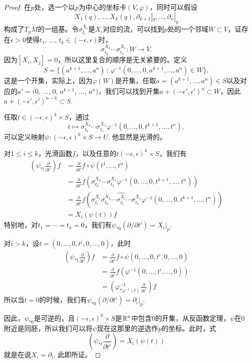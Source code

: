 \begin{proof}
在$p$处，选一个以$p$为中心的坐标卡$(V,\varphi)$，同时可以假设
\[
	X_1(q),\dots,X_k(q),\partial_{k+1}|_q,\dots,\partial_{n}|_q
\]
构成了$T_pM$的一组基。令$\sigma_{t_i}^{X_i}$是$X_i$对应的流，可以找到$p$处的一个邻域$W\subset V$，证存在$\epsilon>0$使得$t_1$, $\dots$, $t_k\in (-\epsilon,\epsilon)$时，
\[
	\sigma_{t_k}^{X_k}\cdots\sigma_{t_1}^{X_1}:W\to V.
\]
因为$[X_i,X_j]=0$，所以这里复合的顺序是无关紧要的。定义
\[
	S=\{(a^{k+1},\dots,a^n)\,:\, \varphi^{-1}(0,\dots,0,a^{k+1},\dots,a^n)\in W\},
\]
这是一个开集，实际上，因为$\varphi(W)$是开集，任取$a=(a^{k+1},\dots,a^n)\in S$以及对应的$a'=(0$, $\dots$, $0$, $a^{k+1}$, $\dots$, $a^n)$，我们可以找到开集$a+(-\epsilon',\epsilon')^n\subset W$，因此$a+(-\epsilon',\epsilon')^{n-k}\subset S$.

任取$t\in (-\epsilon,\epsilon)^k\times S$，通过
\[
	t\mapsto \sigma_{t_k}^{X_k}\cdots\sigma_{t_1}^{X_1}\varphi^{-1}(0,\dots,0,t^{k+1},\dots,t^n),
\]
可以定义映射$\psi:(-\epsilon,\epsilon)^k\times S\to U$. 他显然是光滑的。

对$1\leq i\leq k$，光滑函数$f$，以及任意的$t(-\epsilon,\epsilon)^k\times S$，我们有
\begin{align*}
\left(\psi_{*t}\frac{\partial}{\partial t^i}\right)f&=\frac{\partial}{\partial t^i} f\circ \psi (t^1,\dots,t^n)\\
&=\frac{\partial}{\partial t^i} f\left(\sigma_{t_k}^{X_k}\cdots\sigma_{t_1}^{X_1}\varphi^{-1}(0,\dots,0,t^{k+1},\dots,t^n)\right)\\
&=\frac{\partial}{\partial t^i} f\left(\sigma_{t_i}^{X_i}\sigma_{t_k}^{X_k}\cdots\widehat{\sigma_{t_i}^{X_i}}\cdots\sigma_{t_1}^{X_1}\varphi^{-1}(0,\dots,0,t^{k+1},\dots,t^n)\right)\\
&=X_i(\psi(t))f
\end{align*}
特别地，对$t_1=\cdots=t_k=0$，我们有$\psi_{*0}(\partial/\partial t^i)=X_i|_p$. 

对$i>k$，设$t=(0,\dots,0,t^i,0,\dots,0)$，此时
\begin{align*}
\left(\psi_{*t}\frac{\partial}{\partial t^i}\right)f&=\frac{\partial}{\partial t^i} f\circ \psi (0,\dots,0,t^i,0,\dots,0)\\
&=\frac{\partial}{\partial t^i} f\left(\varphi^{-1}(0,\dots,t^i,\dots,0)\right)\\
&=\left(\varphi_{*\varphi^{-1}(t)}^{-1}\frac{\partial}{\partial t^i}\right)f
\end{align*}
所以当$t=0$的时候，我们有$\psi_{*0}(\partial/\partial t^i)=\partial_i|_p$.

因此，$\psi_{*0}$是可逆的，且$(-\epsilon,\epsilon)^k\times S$是$\mathbb{R}^n$中包含$0$的开集，从反函数定理，$\psi$在$0$附近是同胚，所以我们可以将$\psi$现在这那里的逆选作$p$的坐标。此时，式
\[
	\left(\psi_{*t}\frac{\partial}{\partial t^i}\right)=X_i(\psi(t))
\]
就是在说$X_i=\partial_i$. 此即所证。
\end{proof}

